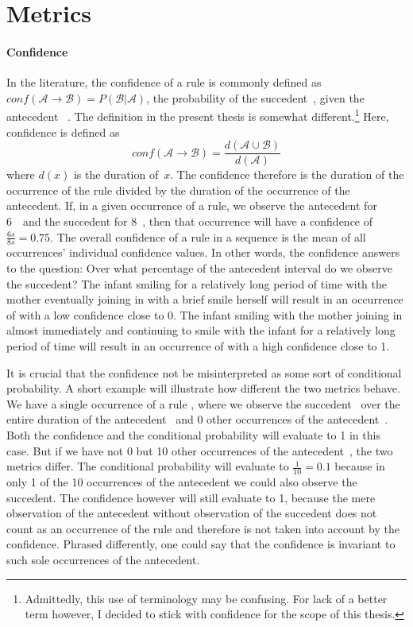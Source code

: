 \section{Metrics}
\label{sec:fpmmetr}
\paragraph{Confidence}
In the literature, the confidence of a rule  is commonly defined as \(conf(\mathcal{A\rightarrow B}) = P(\mathcal{B|A})\), the probability of the succedent~, given the antecedent~ \citep[]{han_data_2012}.
The definition in the present thesis is somewhat different.\footnote{%
Admittedly, this use of terminology may be confusing. For lack of a better term however, I decided to stick with confidence for the scope of this thesis.}
Here, confidence is defined as
\[conf(\mathcal{A \rightarrow B}) = \frac{d(\mathcal{A \cup B})}{d(\mathcal{A})}\]
where \(d(x)\) is the duration of~\(x\).
The confidence therefore is the duration of the occurrence of the rule divided by the duration of the occurrence of the antecedent.
If, in a given occurrence of a rule, we observe the antecedent for 6~\s\ and the succedent for 8~\s, then that occurrence will have a confidence of \(\frac{6s}{8s} = 0.75\).
The overall confidence of a rule in a sequence is the mean of all occurrences' individual confidence values.
In other words, the confidence answers to the question:
Over what percentage of the antecedent interval do we observe the succedent?
The infant smiling for a relatively long period of time with the mother eventually joining in with a brief smile herself will result in an occurrence of  with a low confidence close to 0.
The infant smiling with the mother joining in almost immediately and continuing to smile with the infant for a relatively long period of time will result in an occurrence of  with a high confidence close to 1.

It is crucial that the confidence not be misinterpreted as some sort of conditional probability.
A short example will illustrate how different the two metrics behave.
We have a single occurrence of a rule , where we observe the succedent~ over the entire duration of the antecedent~ and 0 other occurrences of the antecedent~.
Both the confidence and the conditional probability will evaluate to 1 in this case.
But if we have not 0 but 10 other occurrences of the antecedent~, the two metrics differ.
The conditional probability will evaluate to \(\frac{1}{10} = 0.1\) because in only 1 of the 10 occurrences of the antecedent we could also observe the succedent.
The confidence however will still evaluate to 1, because the mere observation of the antecedent without observation of the succedent does not count as an occurrence of the rule  and therefore is not taken into account by the confidence.
Phrased differently, one could say that the confidence is invariant to such sole occurrences of the antecedent.

